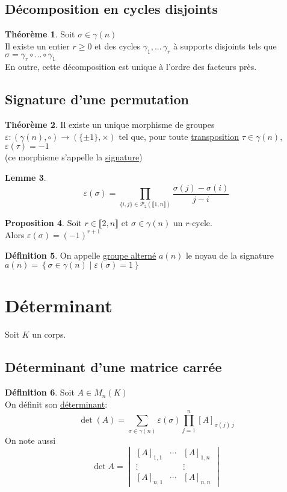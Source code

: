 \documentclass[10pt,a4paper]{article}
\theoremstyle{definition}
\newtheorem{proposition}{Proposition}[section]
\newtheorem{theorem}[proposition]{Théorème}
\newtheorem{lemme}[proposition]{Lemme}
\newtheorem{definition}[proposition]{Définition}
\begin{document}
\subsection{Décomposition en cycles disjoints}
\begin{theorem}
Soit $\sigma \in \gamma(n)$ \\
Il existe un entier $r \geq 0$ et des cycles $\gamma_1, ...\, \gamma_r$ à supports disjoints tels que $\sigma = \gamma_r \circ ... \circ \gamma_1$ \\
En outre, cette décomposition est unique à l'ordre des facteurs près.
\end{theorem}

\subsection{Signature d'une permutation}
\begin{theorem}
Il existe un unique morphisme de groupes $\varepsilon: (\gamma(n), \circ) \to (\{ \pm 1 \}, \times)$ tel que, pour toute \uline{transposition} $\tau \in \gamma(n)$, $\varepsilon(\tau) = -1$ \\
(ce morphisme s'appelle la \uline{signature})
\end{theorem}
\begin{lemme}
\[\varepsilon(\sigma) = \prod_{\{i, j\} \in \mathcal{P}_2(\llbracket 1, n \rrbracket)} \frac{\sigma(j) - \sigma(i)}{j - i}\]
\end{lemme}
\begin{proposition}
Soit $r \in \llbracket 2, n \rrbracket$ et $\sigma \in \gamma(n)$ un $r$-cycle. \\
Alors $\varepsilon(\sigma) = (-1)^{r + 1}$
\end{proposition}
\begin{definition}
On appelle \uline{groupe alterné} $a(n)$ le noyau de la signature $a(n) = \left\{ \sigma \in \gamma(n) \mid \varepsilon(\sigma) = 1 \right\}$
\end{definition}

\pagebreak

\section{Déterminant}
Soit $K$ un corps.
\subsection{Déterminant d'une matrice carrée}
\begin{definition}
Soit $A \in M_n(K)$ \\
On définit son \uline{déterminant}:
\[ \det(A) = \sum_{\sigma \in \gamma(n)} \varepsilon(\sigma) \prod_{j = 1}^n [A]_{\sigma(j) \, j}\]
On note aussi
\[ \det A = \begin{vmatrix}
[A]_{1, 1} & \cdots & [A]_{1, n} \\
\vdots & & \vdots \\
[A]_{n, 1} & \cdots & [A]_{n ,n}
\end{vmatrix}\]
\end{definition}
\end{document}
